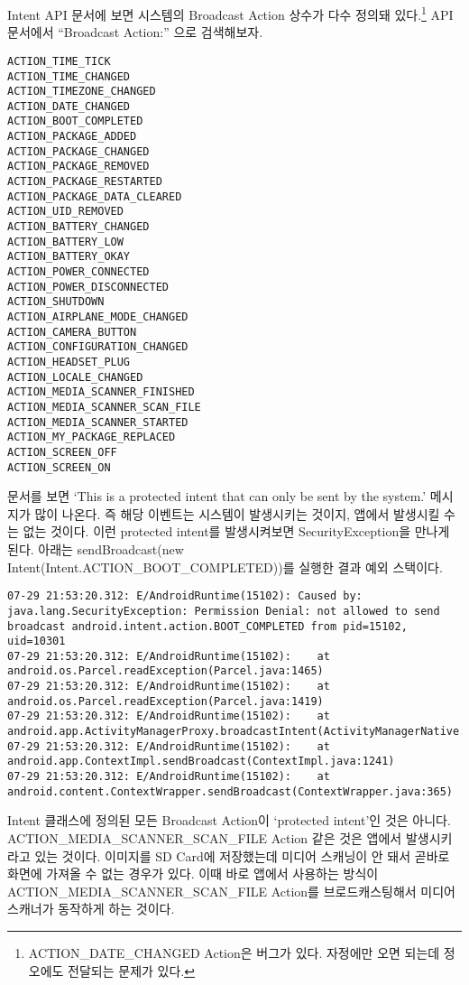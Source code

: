 Intent API 문서에 보면 시스템의 Broadcast Action 상수가 다수 정의돼 있다.\footnote{ACTION\_DATE\_CHANGED Action은 버그가 있다. 자정에만 오면 되는데 정오에도 전달되는 문제가 있다.
} API 문서에서 ``Broadcast Action:'' 으로 검색해보자.

\begin{verbatim}
ACTION_TIME_TICK
ACTION_TIME_CHANGED
ACTION_TIMEZONE_CHANGED
ACTION_DATE_CHANGED
ACTION_BOOT_COMPLETED
ACTION_PACKAGE_ADDED
ACTION_PACKAGE_CHANGED
ACTION_PACKAGE_REMOVED
ACTION_PACKAGE_RESTARTED
ACTION_PACKAGE_DATA_CLEARED
ACTION_UID_REMOVED
ACTION_BATTERY_CHANGED
ACTION_BATTERY_LOW
ACTION_BATTERY_OKAY
ACTION_POWER_CONNECTED
ACTION_POWER_DISCONNECTED
ACTION_SHUTDOWN
ACTION_AIRPLANE_MODE_CHANGED
ACTION_CAMERA_BUTTON
ACTION_CONFIGURATION_CHANGED
ACTION_HEADSET_PLUG
ACTION_LOCALE_CHANGED
ACTION_MEDIA_SCANNER_FINISHED
ACTION_MEDIA_SCANNER_SCAN_FILE
ACTION_MEDIA_SCANNER_STARTED
ACTION_MY_PACKAGE_REPLACED
ACTION_SCREEN_OFF
ACTION_SCREEN_ON
\end{verbatim}

문서를 보면 `This is a protected intent that can only be sent by the system.' 메시지가 많이 나온다. 즉 해당 이벤트는 시스템이 발생시키는 것이지, 앱에서 발생시킬 수는 없는 것이다.
이런 protected intent를 발생시켜보면 SecurityException을 만나게 된다. 아래는 
sendBroadcast(new Intent(Intent.ACTION\_BOOT\_COMPLETED))를 실행한 결과 예외 스택이다.
\begin{lstlisting}[frame=single] 
07-29 21:53:20.312: E/AndroidRuntime(15102): Caused by: java.lang.SecurityException: Permission Denial: not allowed to send broadcast android.intent.action.BOOT_COMPLETED from pid=15102, uid=10301
07-29 21:53:20.312: E/AndroidRuntime(15102): 	at android.os.Parcel.readException(Parcel.java:1465)
07-29 21:53:20.312: E/AndroidRuntime(15102): 	at android.os.Parcel.readException(Parcel.java:1419)
07-29 21:53:20.312: E/AndroidRuntime(15102): 	at android.app.ActivityManagerProxy.broadcastIntent(ActivityManagerNative.java:2430)
07-29 21:53:20.312: E/AndroidRuntime(15102): 	at android.app.ContextImpl.sendBroadcast(ContextImpl.java:1241)
07-29 21:53:20.312: E/AndroidRuntime(15102): 	at android.content.ContextWrapper.sendBroadcast(ContextWrapper.java:365)
\end{lstlisting}

Intent 클래스에 정의된 모든 Broadcast Action이 `protected intent'인 것은 아니다.
ACTION\_MEDIA\_SCANNER\_SC\-AN\_FI\-LE Action 같은 것은 앱에서 발생시키라고 있는 것이다.
이미지를 SD Card에 저장했는데 미디어 스캐닝이 안 돼서 곧바로 화면에 가져올 수 없는 경우가 있다.
이때 바로 앱에서 사용하는 방식이 ACTION\_MEDIA\_SCANNER\_SCAN\_FILE Action를 브로드캐스팅해서 미디어 스캐너가 동작하게 하는 것이다.\\

